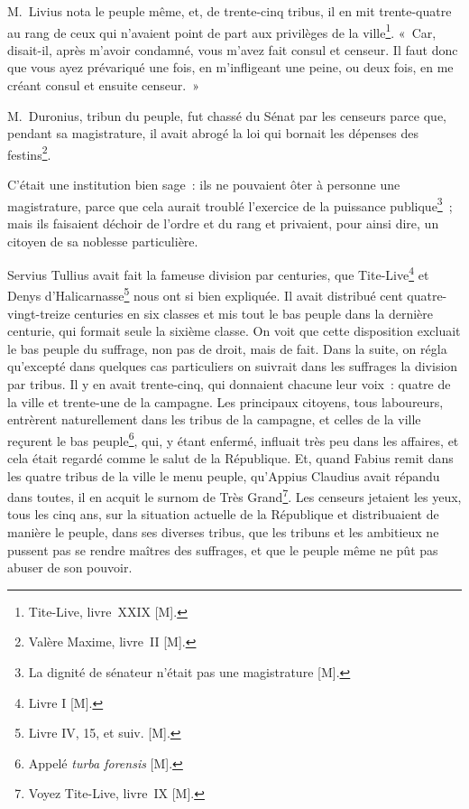 \documentclass[french,twoside]{book} %
\begin{document}
M. Livius nota le peuple même, et, de trente-cinq tribus, il en mit trente-quatre au rang de ceux qui n’avaient point de part aux privilèges de la ville\footnote{Tite-Live, livre XXIX [M].}. « Car, disait-il, après m’avoir condamné, vous m’avez fait consul et censeur. Il faut donc que vous ayez prévariqué une fois, en m’infligeant une peine, ou deux fois, en me créant consul et ensuite censeur. »\par
M. Duronius, tribun du peuple, fut chassé du Sénat par les censeurs parce que, pendant sa magistrature, il avait abrogé la loi qui bornait les dépenses des festins\footnote{Valère Maxime, livre II [M].}.\par
C’était une institution bien sage : ils ne pouvaient ôter à personne une magistrature, parce que cela aurait troublé l’exercice de la puissance publique\footnote{La dignité de sénateur n’était pas une magistrature [M].} ; mais ils faisaient déchoir de l’ordre et du rang et privaient, pour ainsi dire, un citoyen de sa noblesse particulière.\par
Servius Tullius avait fait la fameuse division par centuries, que Tite-Live\footnote{Livre I [M].} et Denys d’Halicarnasse\footnote{Livre IV, 15, et suiv. [M].} nous ont si bien expliquée. Il avait distribué cent quatre-vingt-treize centuries en six classes et mis tout le bas peuple dans la dernière centurie, qui formait seule la sixième classe. On voit que cette disposition excluait le bas peuple du suffrage, non pas de droit, mais de fait. Dans la suite, on régla qu’excepté dans quelques cas particuliers on suivrait dans les suffrages la division par tribus. Il y en avait trente-cinq, qui donnaient chacune leur voix : quatre de la ville et trente-une de la campagne. Les principaux citoyens, tous laboureurs, entrèrent naturellement dans les tribus de la campagne, et celles de la ville reçurent le bas peuple\footnote{Appelé {\itshape turba forensis} [M].}, qui, y étant enfermé, influait très peu dans les affaires, et cela était regardé comme le salut de la République. Et, quand Fabius remit dans les quatre tribus de la ville le menu peuple, qu’Appius Claudius avait répandu dans toutes, il en acquit le surnom de Très Grand\footnote{Voyez Tite-Live, livre IX [M].}. Les censeurs jetaient les yeux, tous les cinq ans, sur la situation actuelle de la République et distribuaient de manière le peuple, dans ses diverses tribus, que les tribuns et les ambitieux ne pussent pas se rendre maîtres des suffrages, et que le peuple même ne pût pas abuser de son pouvoir.\par
\end{document}
